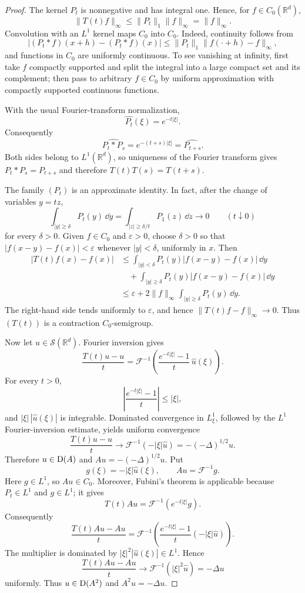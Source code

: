 \begin{proof}
The kernel $P_t$ is nonnegative and has integral one.  Hence, for
$f\in C_0(\mathbb R^d)$,
\[
  \|T(t)f\|_\infty
  \le \|P_t\|_1\|f\|_\infty
  =\|f\|_\infty.
\]
Convolution with an $L^1$ kernel maps $C_0$ into $C_0$.  Indeed, continuity
follows from
\[
  |(P_t*f)(x+h)-(P_t*f)(x)|
  \le \|P_t\|_1\|f(\cdot+h)-f\|_\infty,
\]
and functions in $C_0$ are uniformly continuous.  To see vanishing at
infinity, first take $f$ compactly supported and split the integral into a
large compact set and its complement; then pass to arbitrary $f\in C_0$ by
uniform approximation with compactly supported continuous functions.

With the usual Fourier-transform normalization,
\[
  \widehat{P_t}(\xi)=e^{-t|\xi|}.
\]
Consequently
\[
  \widehat{P_t*P_s}
  =e^{-(t+s)|\xi|}
  =\widehat{P_{t+s}}.
\]
Both sides belong to $L^1(\mathbb R^d)$, so uniqueness of the Fourier
transform gives $P_t*P_s=P_{t+s}$ and therefore
$T(t)T(s)=T(t+s)$.

The family $(P_t)$ is an approximate identity.  In fact, after the change of
variables $y=tz$,
\[
  \int_{|y|\ge\delta}P_t(y)\,\dd y
  =\int_{|z|\ge\delta/t}P_1(z)\,\dd z
  \longrightarrow0
  \qquad(t\downarrow0)
\]
for every $\delta>0$.  Given $f\in C_0$ and $\varepsilon>0$, choose
$\delta>0$ so that
$|f(x-y)-f(x)|<\varepsilon$ whenever $|y|<\delta$, uniformly in $x$.  Then
\[
\begin{aligned}
  |T(t)f(x)-f(x)|
  &\le \int_{|y|<\delta}P_t(y)|f(x-y)-f(x)|\,\dd y \\
  &\quad+
    \int_{|y|\ge\delta}P_t(y)|f(x-y)-f(x)|\,\dd y \\
  &\le \varepsilon
      +2\|f\|_\infty
        \int_{|y|\ge\delta}P_t(y)\,\dd y.
\end{aligned}
\]
The right-hand side tends uniformly to $\varepsilon$, and hence
$\|T(t)f-f\|_\infty\to0$.  Thus $(T(t))$ is a contraction
$C_0$-semigroup.

Now let $u\in\mathcal S(\mathbb R^d)$.  Fourier inversion gives
\[
  \frac{T(t)u-u}{t}
  =\mathcal F^{-1}\!\left(
      \frac{e^{-t|\xi|}-1}{t}\,\widehat u(\xi)
    \right).
\]
For every $t>0$,
\[
  \left|\frac{e^{-t|\xi|}-1}{t}\right|
  \le |\xi|,
\]
and $|\xi|\,|\widehat u(\xi)|$ is integrable.  Dominated convergence in
$L^1_\xi$, followed by the $L^1$ Fourier-inversion estimate, yields uniform
convergence
\[
  \frac{T(t)u-u}{t}
  \longrightarrow
  \mathcal F^{-1}(-|\xi|\widehat u)
  =-(-\Delta)^{1/2}u.
\]
Therefore $u\in\operatorname{D}(A)$ and $Au=-(-\Delta)^{1/2}u$.  Put
\[
  g(\xi)=-|\xi|\widehat u(\xi),
  \qquad Au=\mathcal F^{-1}g.
\]
Here $g\in L^1$, so $Au\in C_0$.  Moreover, Fubini's theorem is applicable
because $P_t\in L^1$ and $g\in L^1$; it gives
\[
  T(t)Au=\mathcal F^{-1}(e^{-t|\xi|}g).
\]
Consequently
\[
  \frac{T(t)Au-Au}{t}
  =\mathcal F^{-1}\!\left(
      \frac{e^{-t|\xi|}-1}{t}(-|\xi|\widehat u)
    \right).
\]
The multiplier is dominated by
$|\xi|^2|\widehat u(\xi)|\in L^1$.  Hence
\[
  \frac{T(t)Au-Au}{t}
  \longrightarrow
  \mathcal F^{-1}(|\xi|^2\widehat u)
  =-\Delta u
\]
uniformly.  Thus $u\in\operatorname{D}(A^2)$ and $A^2u=-\Delta u$.
\end{proof}
